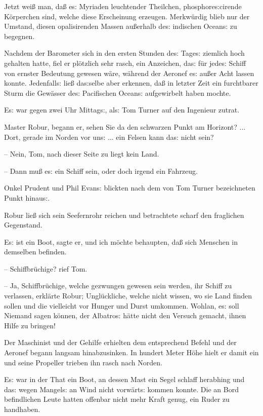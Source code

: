 \documentclass[oneside,12pt]{book}
\newcommand{\s}{s:}
\begin{document}
Jetzt wei{\ss} man, da{\ss} e{\s} Myriaden leuchtender Theilchen,
phosphore{\s}cirende K\"orperchen sind, welche diese Erscheinung
erzeugen. Merkw\"urdig blieb nur der Umstand, diesen opalisirenden
Massen au{\ss}erhalb de{\s} indischen Ocean{\s} zu begegnen.

Nachdem der Barometer sich in den ersten Stunden de{\s} Tage{\s}
ziemlich hoch gehalten hatte, fiel er pl\"otzlich sehr rasch, ein
Anzeichen, da{\s} f\"ur jede{\s} Schiff von ernster Bedeutung gewesen
w\"are, w\"ahrend der Aeronef e{\s} au{\ss}er Acht lassen konnte.
Jedenfall{\s} lie{\ss} da{\s}selbe aber erkennen, da{\ss} in letzter
Zeit ein furchtbarer Sturm die Gew\"asser de{\s} Pacifischen
Ocean{\s} aufgewirbelt haben mochte.

E{\s} war gegen zwei Uhr Mittag{\s}, al{\s} Tom Turner auf den
Ingenieur zutrat.

{\glqq}Master Robur, begann er, sehen Sie da den schwarzen Punkt am
Horizont? ... Dort, gerade im Norden vor un{\s} ... ein Felsen kann
da{\s} nicht sein?

-- Nein, Tom, nach dieser Seite zu liegt kein Land.

-- Dann mu{\ss} e{\s} ein Schiff sein, oder doch irgend ein
Fahrzeug.{\grqq}

Onkel Prudent und Phil Evan{\s} blickten nach dem von Tom Turner
bezeichneten Punkt hinau{\s}.

Robur lie{\ss} sich sein Seefernrohr reichen und betrachtete scharf
den fraglichen Gegenstand.

{\glqq}E{\s} ist ein Boot, sagte er, und ich m\"ochte behaupten,
da{\ss} sich Menschen in demselben befinden.

-- Schiffbr\"uchige? rief Tom.

-- Ja, Schiffbr\"uchige, welche gezwungen gewesen sein werden, ihr
Schiff zu verlassen, erkl\"arte Robur; Ungl\"uckliche, welche nicht
wissen, wo sie Land finden sollen und die vielleicht vor Hunger und
Durst umkommen. Wohlan, e{\s} soll Niemand sagen k\"onnen, der
{\glqq}Albatro{\s}{\grqq} h\"atte nicht den Versuch gemacht, ihnen
Hilfe zu bringen!{\grqq}

Der Maschinist und der Gehilfe erhielten dem entsprechend Befehl und
der Aeronef begann langsam hinabzusinken. In hundert Meter H\"ohe
hielt er damit ein und seine Propeller trieben ihn rasch nach Norden.

E{\s} war in der That ein Boot, an dessen Mast ein Segel schlaff
herabhing und da{\s} wegen Mangel{\s} an Wind nicht vorw\"art{\s}
kommen konnte. Die an Bord befindlichen Leute hatten offenbar nicht
mehr Kraft genug, ein Ruder zu handhaben.
\end{document}
